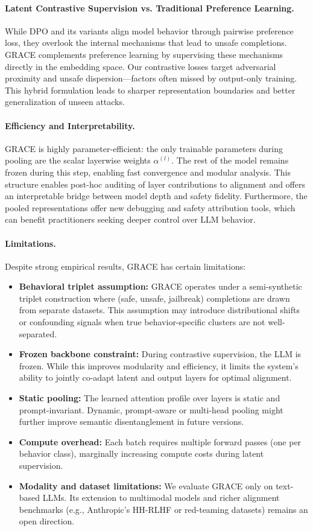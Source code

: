 \paragraph{Latent Contrastive Supervision vs. Traditional Preference Learning.}
While DPO and its variants align model behavior through pairwise preference loss, they overlook the internal mechanisms that lead to unsafe completions. GRACE complements preference learning by supervising these mechanisms directly in the embedding space. Our contrastive losses target adversarial proximity and unsafe dispersion—factors often missed by output-only training. This hybrid formulation leads to sharper representation boundaries and better generalization of unseen attacks.

\paragraph{Efficiency and Interpretability.}
GRACE is highly parameter-efficient: the only trainable parameters during pooling are the scalar layerwise weights $\alpha^{(l)}$. The rest of the model remains frozen during this step, enabling fast convergence and modular analysis. This structure enables post-hoc auditing of layer contributions to alignment and offers an interpretable bridge between model depth and safety fidelity. Furthermore, the pooled representations offer new debugging and safety attribution tools, which can benefit practitioners seeking deeper control over LLM behavior.

\paragraph{Limitations.}
Despite strong empirical results, GRACE has certain limitations:
\begin{itemize}
    \item \textbf{Behavioral triplet assumption:} GRACE operates under a semi-synthetic triplet construction where (safe, unsafe, jailbreak) completions are drawn from separate datasets. This assumption may introduce distributional shifts or confounding signals when true behavior-specific clusters are not well-separated.
    \item \textbf{Frozen backbone constraint:} During contrastive supervision, the LLM is frozen. While this improves modularity and efficiency, it limits the system’s ability to jointly co-adapt latent and output layers for optimal alignment.
    \item \textbf{Static pooling:} The learned attention profile over layers is static and prompt-invariant. Dynamic, prompt-aware or multi-head pooling might further improve semantic disentanglement in future versions.
    \item \textbf{Compute overhead:} Each batch requires multiple forward passes (one per behavior class), marginally increasing compute costs during latent supervision.
    \item \textbf{Modality and dataset limitations:} We evaluate GRACE only on text-based LLMs. Its extension to multimodal models and richer alignment benchmarks (e.g., Anthropic's HH-RLHF or red-teaming datasets) remains an open direction.
\end{itemize}

